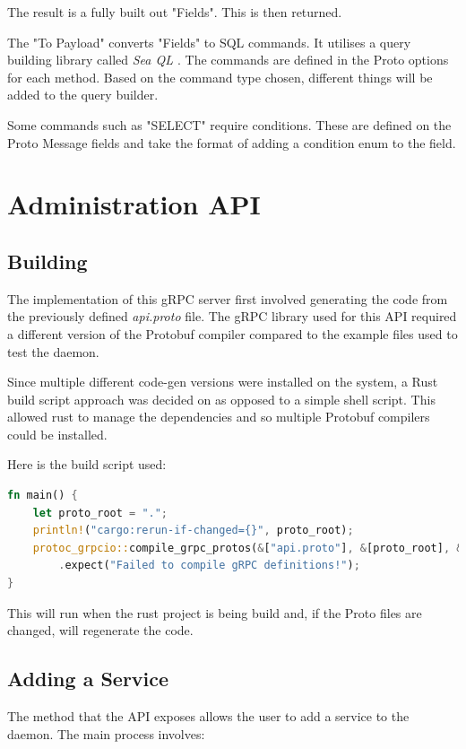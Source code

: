 \documentclass[a4paper,12pt]{report}
\begin{document}
The result is a fully built out "Fields". This is then returned.

The "To Payload" converts "Fields" to SQL commands. It utilises a query building library called \textit{Sea QL \cite{sea}}. 
The commands are defined in the Proto options for each method. Based on the command type chosen, different things will be added to the query builder.

Some commands such as "SELECT" require conditions. These are defined on the Proto Message fields and take the format of adding a condition enum to the field.

\section{Administration API}

\subsection{Building}

The implementation of this gRPC server first involved generating the code from the previously defined \textit{api.proto} file.
The gRPC library used for this API required a different version of the Protobuf compiler compared to the example files used to test the daemon.

Since multiple different code-gen versions were installed on the system, a Rust build script \cite{build} approach was decided on as opposed to a simple shell script. 
This allowed rust to manage the dependencies and so multiple Protobuf compilers could be installed. 

Here is the build script used:
\begin{lstlisting}[language=Rust]
fn main() {
    let proto_root = ".";
    println!("cargo:rerun-if-changed={}", proto_root);
    protoc_grpcio::compile_grpc_protos(&["api.proto"], &[proto_root], &proto_root, None)
        .expect("Failed to compile gRPC definitions!");
}
\end{lstlisting}
This will run when the rust project is being build and, if the Proto files are changed, will regenerate the code.

\subsection{Adding a Service}
The method that the API exposes allows the user to add a service to the daemon. The main process involves:
\end{document}
